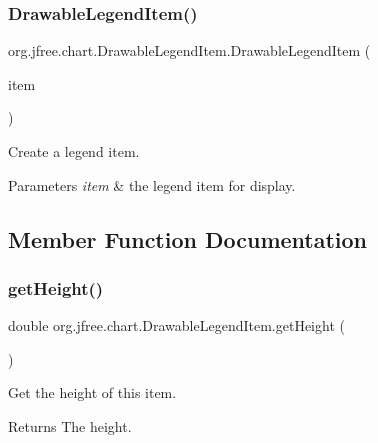 \subsubsection{\texorpdfstring{Drawable\+Legend\+Item()}{DrawableLegendItem()}}
{\footnotesize\ttfamily org.\+jfree.\+chart.\+Drawable\+Legend\+Item.\+Drawable\+Legend\+Item (\begin{DoxyParamCaption}\item[{\mbox{\hyperlink{classorg_1_1jfree_1_1chart_1_1_legend_item}{Legend\+Item}}}]{item }\end{DoxyParamCaption})}

Create a legend item.


\begin{DoxyParams}{Parameters}
{\em item} & the legend item for display. \\
\hline
\end{DoxyParams}


\subsection{Member Function Documentation}
\mbox{\label{classorg_1_1jfree_1_1chart_1_1_drawable_legend_item_afde5ae5e89d64e488c21cf091cb66c9b}} 
\subsubsection{\texorpdfstring{get\+Height()}{getHeight()}}
{\footnotesize\ttfamily double org.\+jfree.\+chart.\+Drawable\+Legend\+Item.\+get\+Height (\begin{DoxyParamCaption}{ }\end{DoxyParamCaption})}

Get the height of this item.

\begin{DoxyReturn}{Returns}
The height. 
\end{DoxyReturn}
\mbox{\label{classorg_1_1jfree_1_1chart_1_1_drawable_legend_item_acadbd9754ae9e2acb59ec81c68f55872}} 
